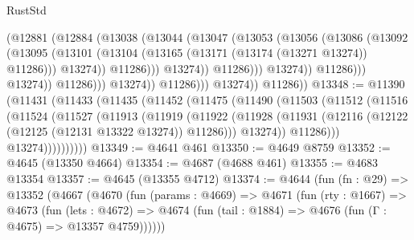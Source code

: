 \begin{lexlean}{RustStd}
\begin{coremodule}
                                        (@12881
                                          (@12884
                                            (@13038
                                              (@13044
                                                (@13047
                                                  (@13053
                                                    (@13056
                                                      (@13086
                                                        (@13092
                                                          (@13095
                                                            (@13101
                                                              (@13104
                                                                (@13165
                                                                  (@13171
                                                                    (@13174 (@13271 @13274))
                                                                    @11286)))
                                                              @13274))
                                                          @11286)))
                                                    @13274))
                                                @11286)))
                                          @13274))
                                      @11286)))
                                @13274))
                            @11286)))
                      @13274))
                  @11286)))
            @13274))
        @11286))
@13348 := @11390
    (@11431
      (@11433
        (@11435
          (@11452
            (@11475
              (@11490
                (@11503
                  (@11512
                    (@11516
                      (@11524
                        (@11527
                          (@11913
                            (@11919
                              (@11922
                                (@11928
                                  (@11931 (@12116 (@12122 (@12125 (@12131 @13322 @13274)) @11286)))
                                  @13274))
                              @11286)))
                        @13274))))))))))
@13349 := @4641 @461
@13350 := @4649 @8759
@13352 := @4645 (@13350 @4664)
@13354 := @4687 (@4688 @461)
@13355 := @4683 @13354
@13357 := @4645 (@13355 @4712)
@13374 := @4644
    (fun (fn : @29) =>
    @13352
      (@4667
        (@4670
          (fun (params : @4669) =>
          @4671
            (fun (rty : @1667) =>
            @4673
              (fun (lets : @4672) =>
              @4674 (fun (tail : @1884) => @4676 (fun (Γ : @4675) => @13357 @4759))))))

\end{coremodule}
\end{lexlean}
